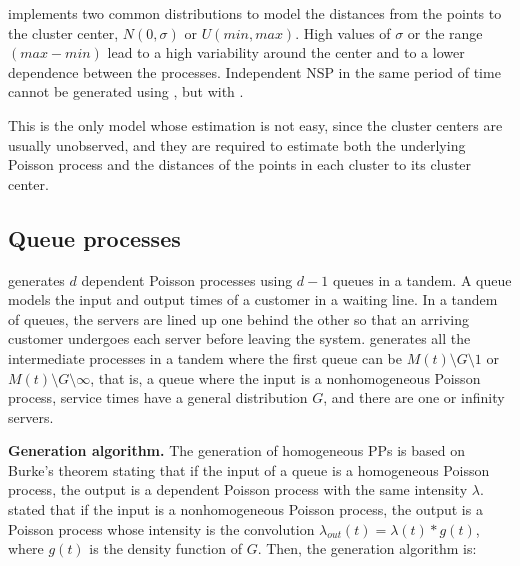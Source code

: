  implements two common  distributions  to model the   distances from the points to the cluster center, $N(0, \sigma)$ or  $U(min, max)$.  High values of $\sigma$ or the range $(max-min)$ lead to a high variability around the center and to a lower dependence between the processes. Independent NSP in the same period of time cannot be generated using , but with .

This is the only model whose estimation  is not easy, since the cluster centers are  usually unobserved, and  they are required to estimate both the  underlying Poisson process and the distances of the  points  in each cluster to its cluster center.


\subsection{Queue processes}

  generates   $d$ dependent  Poisson processes  using  $d-1$  queues in a tandem.  A queue models  the input and  output times of a customer in a waiting line.   In a tandem  of queues, the servers are lined up one behind the other so that an arriving customer   undergoes each server before  leaving the system.  	 generates all the intermediate processes in a tandem where the first queue  can be  $M(t)\setminus G\setminus 1$  or $M(t) \setminus G \setminus \infty$, that is, a queue  where the input is a nonhomogeneous Poisson process,  service times have a general distribution $G$,  and  there are one  or infinity servers. 

\textbf{Generation algorithm.} The generation of   homogeneous  PPs is based on Burke's theorem stating that if the  input  of a queue is a  homogeneous  Poisson process, the output  is a dependent  Poisson process with the same intensity $\lambda$. 
\citet{Keilson94} stated  that if the input  is a nonhomogeneous Poisson process, the output is a Poisson  process  whose intensity is the convolution $\lambda_{out}(t)=\lambda(t)*g(t)$, where $g(t)$ is the density  function of $G$. Then,   the generation algorithm is:


